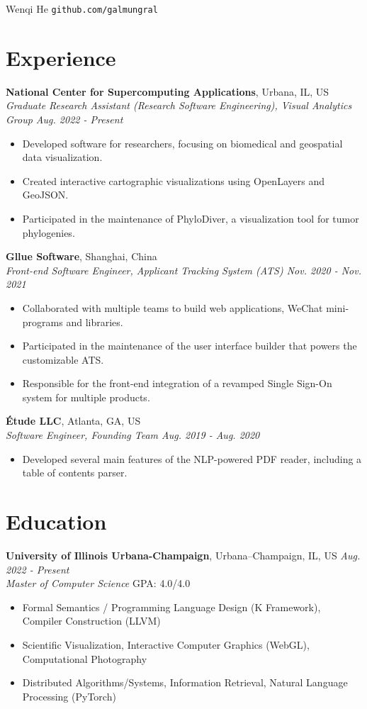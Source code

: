 \documentclass[11pt]{article}
\begin{document}
{\Huge Wenqi He} \quad \texttt{github.com/galmungral}

\section*{Experience}

\textbf{National Center for Supercomputing Applications}, Urbana, IL, US\\
\textit{Graduate Research Assistant (Research Software Engineering), Visual Analytics Group \hfill Aug. 2022 - Present}
\begin{itemize}
\item Developed software for researchers, focusing on biomedical and geospatial data visualization.
\item Created interactive cartographic visualizations using OpenLayers and GeoJSON.
\item Participated in the maintenance of PhyloDiver, a visualization tool for tumor phylogenies.
\end{itemize}

\textbf{Gllue Software}, Shanghai, China\\
\textit{Front-end Software Engineer, Applicant Tracking System (ATS) \hfill Nov. 2020 - Nov. 2021}
\begin{itemize}
\item Collaborated with multiple teams to build web applications, WeChat mini-programs and libraries.
\item Participated in the maintenance of the user interface builder that powers the customizable ATS.
\item Responsible for the front-end integration of a revamped Single Sign-On system for multiple products.
\end{itemize}

\textbf{Étude LLC}, Atlanta, GA, US\\
\textit{Software Engineer, Founding Team \hfill Aug. 2019 - Aug. 2020}
\begin{itemize}
\item Developed several main features of the NLP-powered PDF reader, including a table of contents parser.
\end{itemize}

\section*{Education}
\textbf{University of Illinois Urbana-Champaign}, Urbana–Champaign, IL, US \hfill \textit{Aug. 2022 - Present} \\
\textit{Master of Computer Science}  \hfill GPA: 4.0/4.0 
\begin{itemize}
\small
\item Formal Semantics / Programming Language Design (K Framework), Compiler Construction (LLVM)
\item Scientific Visualization, Interactive Computer Graphics (WebGL), Computational Photography
\item Distributed Algorithms/Systems, Information Retrieval, Natural Language Processing (PyTorch)
\end{itemize}
\end{document}
